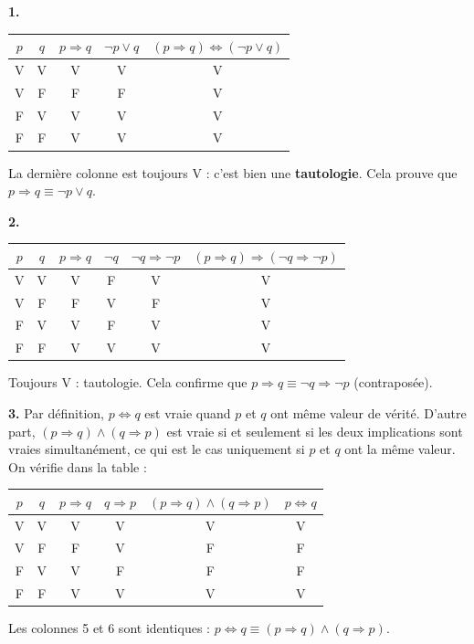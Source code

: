 \documentclass[12pt,a4paper]{article}
\begin{document}
\begin{boitecorrige}
\textbf{1.}
\begin{center}
\begin{tabular}{cc|c|c|c}
$p$ & $q$ & $p\Rightarrow q$ & $\neg p\vee q$ & $(p\Rightarrow q)\Leftrightarrow(\neg p\vee q)$\\
\hline
V & V & V & V & V\\
V & F & F & F & V\\
F & V & V & V & V\\
F & F & V & V & V\\
\end{tabular}
\end{center}
La dernière colonne est toujours V : c'est bien une \textbf{tautologie}. Cela prouve que $p\Rightarrow q \equiv \neg p\vee q$.

\textbf{2.}
\begin{center}
\begin{tabular}{cc|c|cc|c}
$p$ & $q$ & $p\Rightarrow q$ & $\neg q$ & $\neg q\Rightarrow\neg p$ & $(p\Rightarrow q)\Rightarrow(\neg q\Rightarrow\neg p)$\\
\hline
V & V & V & F & V & V\\
V & F & F & V & F & V\\
F & V & V & F & V & V\\
F & F & V & V & V & V\\
\end{tabular}
\end{center}
Toujours V : tautologie. Cela confirme que $p\Rightarrow q \equiv \neg q\Rightarrow\neg p$ (contraposée).

\textbf{3.} Par définition, $p\Leftrightarrow q$ est vraie quand $p$ et $q$ ont même valeur de vérité. D'autre part, $(p\Rightarrow q)\wedge(q\Rightarrow p)$ est vraie si et seulement si les deux implications sont vraies simultanément, ce qui est le cas uniquement si $p$ et $q$ ont la même valeur. On vérifie dans la table :
\begin{center}
\begin{tabular}{cc|c|c|c|c}
$p$ & $q$ & $p\Rightarrow q$ & $q\Rightarrow p$ & $(p\Rightarrow q)\wedge(q\Rightarrow p)$ & $p\Leftrightarrow q$\\
\hline
V & V & V & V & V & V\\
V & F & F & V & F & F\\
F & V & V & F & F & F\\
F & F & V & V & V & V\\
\end{tabular}
\end{center}
Les colonnes 5 et 6 sont identiques : $p\Leftrightarrow q \equiv (p\Rightarrow q)\wedge(q\Rightarrow p)$.
\end{boitecorrige}
\end{document}
